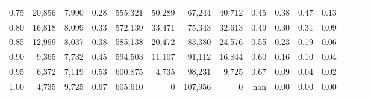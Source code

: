 \begin{tabular}{rrrrrrrrrrrrrrr}
0.75 &  20,856 &  7,990 &  0.28 &  555,321 &   50,289 &   67,244 &   40,712 &  0.45 &  0.38 &  0.47 &      0.13 \\
0.80 &  16,818 &  8,099 &  0.33 &  572,139 &   33,471 &   75,343 &   32,613 &  0.49 &  0.30 &  0.31 &      0.09 \\
0.85 &  12,999 &  8,037 &  0.38 &  585,138 &   20,472 &   83,380 &   24,576 &  0.55 &  0.23 &  0.19 &      0.06 \\
0.90 &   9,365 &  7,732 &  0.45 &  594,503 &   11,107 &   91,112 &   16,844 &  0.60 &  0.16 &  0.10 &      0.04 \\
0.95 &   6,372 &  7,119 &  0.53 &  600,875 &    4,735 &   98,231 &    9,725 &  0.67 &  0.09 &  0.04 &      0.02 \\
1.00 &   4,735 &  9,725 &  0.67 &  605,610 &        0 &  107,956 &        0 &   nan &  0.00 &  0.00 &      0.00 \\
\bottomrule
\end{tabular}
